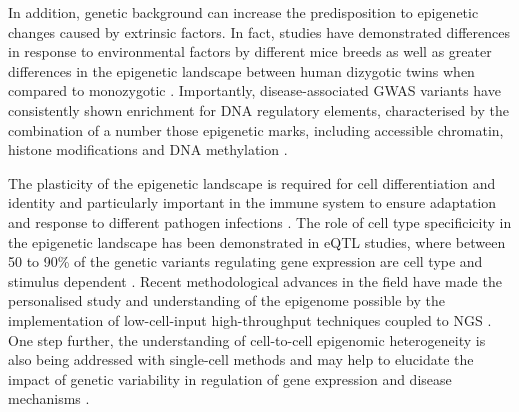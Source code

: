 In addition, genetic background can increase the predisposition to epigenetic changes caused by extrinsic factors. In fact, studies have demonstrated differences in response to environmental factors by different mice breeds as well as greater differences in the epigenetic landscape between human dizygotic twins when compared to monozygotic \parencite{Pogribny2009,Kaminsky2009}. Importantly, disease-associated GWAS variants have consistently shown enrichment for DNA regulatory elements, characterised by the combination of a number those epigenetic marks, including accessible chromatin, histone modifications and DNA methylation \parencite{Trynka2013,Trynka2013b,Gusev2014}. 

The plasticity of the epigenetic landscape is required for cell differentiation and identity and particularly important in the immune system to ensure adaptation and response to different pathogen infections \parencite{Yosef2016}. The role of cell type specificicity in the epigenetic landscape has been demonstrated in eQTL studies, where between 50 to 90\% of the genetic variants regulating gene expression are cell type and stimulus dependent \parencite{Dimas2009,Nica2011,Fairfax2012,Fairfax2014,Raj2014,Naranbhai2015,Kasela2017}. Recent methodological advances in the field have made the personalised study and understanding of the epigenome possible by the implementation of low-cell-input high-throughput techniques coupled to NGS \parencite{Buenrostro2013, Schmidl2015,Oudelaar2017}. One step further, the understanding of cell-to-cell epigenomic heterogeneity is also being addressed with single-cell methods and may help to elucidate the impact of genetic variability in regulation of gene expression and disease mechanisms \parencite{Buenrostro2015, Cusanovich2015,Rotem2015,Nagano2013,Smallwood2014}.




